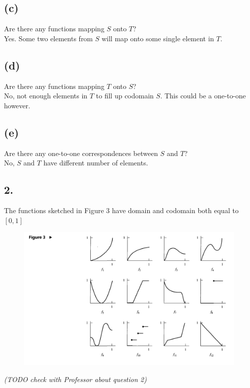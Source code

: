 \documentclass[11pt]{article}
\begin{document}
\subsection*{(c)}
\begin{center}
Are there any functions mapping $S$ onto $T$?\\
\hfill \break
Yes. Some two elements from $S$ will map onto some single element in $T$.
\end{center}

\subsection*{(d)}
\begin{center}
Are there any functions mapping $T$ onto $S$?\\
\hfill \break
No, not enough elements in $T$ to fill up codomain $S$. This could be a one-to-one however.
\end{center}

\subsection*{(e)}
\begin{center}
Are there any one-to-one correspondences between $S$ and $T$?\\
\hfill \break
No, $S$ and $T$ have different number of elements.
\end{center}
%
%
\subsection*{2.}
\begin{center}
The functions sketched in Figure 3 have domain and codomain both equal to $[0,1]$\\
\begin{figure}[h!]
	\includegraphics[width=\linewidth]{figure3.png}
\end{figure}
\textit{(TODO check with Professor about question 2)}
\end{center}
\end{document}
